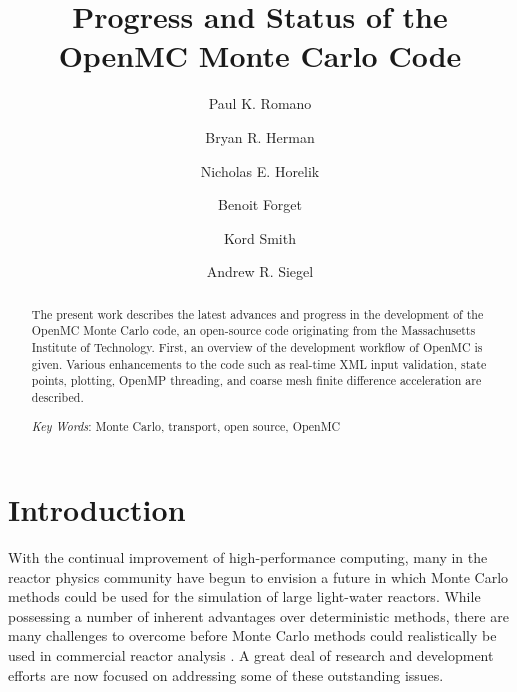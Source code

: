 \documentclass{ansconf}
\begin{document}
\title{Progress and Status of the OpenMC Monte Carlo Code}

\author{Paul K. Romano}
\author{Bryan R. Herman}
\author{Nicholas E. Horelik}
\author{Benoit Forget}
\author{Kord Smith}

\author{Andrew R. Siegel}

\maketitle

\begin{abstract}
The present work describes the latest advances and progress in the development
of the OpenMC Monte Carlo code, an open-source code originating from the
Massachusetts Institute of Technology. First, an overview of the development
workflow of OpenMC is given. Various enhancements to the code such as real-time
XML input validation, state points, plotting, OpenMP threading, and coarse mesh
finite difference acceleration are described.

\emph{Key Words}: Monte Carlo, transport, open source, OpenMC
\end{abstract}

\section{Introduction}

With the continual improvement of high-performance computing, many in the
reactor physics community have begun to envision a future in which Monte Carlo
methods could be used for the simulation of large light-water reactors. While
possessing a number of inherent advantages over deterministic methods, there are
many challenges to overcome before Monte Carlo methods could realistically be
used in commercial reactor analysis \cite{net-martin-2012}. A great deal of
research and development efforts are now focused on addressing some of these
outstanding issues.
\end{document}

